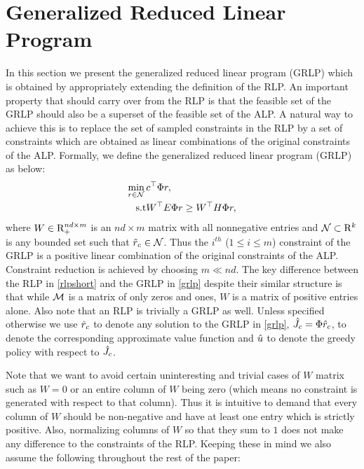 \section{Generalized Reduced Linear Program}
In this section we present the generalized reduced linear program (GRLP) which is obtained by appropriately extending the definition of the RLP. An important property that should carry over from the RLP is that the feasible set of the GRLP should also be a superset of the feasible set of the ALP. A natural way to achieve this is to replace the set of sampled constraints in the RLP by a set of constraints which are obtained as linear combinations of the original constraints of the ALP. Formally, we define the generalized reduced linear program (GRLP) as below:
\begin{align}\label{grlp}
\begin{split}
\underset{r\in \N}{\min}\, &c^\top \Phi r,\\
\text{s.t}\mb & W^\top E\Phi r\geq W^\top H \Phi r, 
\end{split}
\end{align}
where $W \in \mathrm{R}_+^{nd\times m}$ is an $nd\times m$ matrix with all nonnegative entries and $\mathcal{N} \subset \mathrm{R}^k$ is any bounded set such that $\tilde{r}_c \in \mathcal{N}$. 
Thus the $i^{th}$ ($1\leq i\leq m$) constraint of the GRLP is a positive linear combination of the original constraints of the ALP. Constraint reduction is achieved by choosing $m\ll nd$. The key difference between the RLP in \eqref{rlpshort} and the GRLP in \eqref{grlp} despite their similar structure is that while $\mathcal{M}$ is a matrix of only zeros and ones, $W$ is a matrix of positive entries alone. Also note that an RLP is trivially a GRLP as well. Unless specified otherwise we use $\hat{r}_c$ to denote any solution to the GRLP in \eqref{grlp}, $\hat{J}_c=\Phi \hat{r}_c$, to denote the corresponding approximate value function and $\hat{u}$ to denote the greedy policy with respect to $\hat{J}_c$.\par
Note that we want to avoid certain uninteresting and trivial cases of $W$ matrix such as $W=0$ or an entire column of $W$ being zero (which means no constraint is generated with respect to that column). Thus it is intuitive to demand that every column of $W$ should be non-negative and have at least one entry which is strictly positive. Also, normalizing columns of $W$ so that they sum to $1$ does not make any difference to the constraints of the RLP. Keeping these in mind we also assume the following throughout the rest of the paper:

